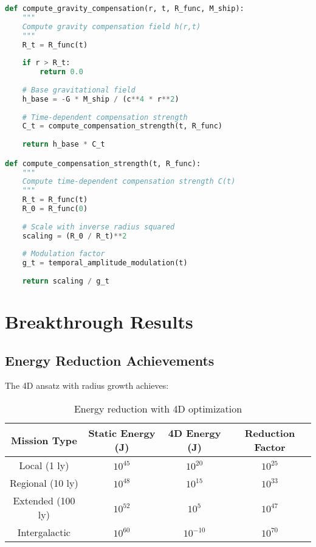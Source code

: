 \documentclass[12pt,a4paper]{article}
\begin{document}
\begin{lstlisting}[language=Python]
def compute_gravity_compensation(r, t, R_func, M_ship):
    """
    Compute gravity compensation field h(r,t)
    """
    R_t = R_func(t)
    
    if r > R_t:
        return 0.0
    
    # Base gravitational field
    h_base = -G * M_ship / (c**4 * r**2)
    
    # Time-dependent compensation strength
    C_t = compute_compensation_strength(t, R_func)
    
    return h_base * C_t

def compute_compensation_strength(t, R_func):
    """
    Compute time-dependent compensation strength C(t)
    """
    R_t = R_func(t)
    R_0 = R_func(0)
    
    # Scale with inverse radius squared
    scaling = (R_0 / R_t)**2
    
    # Modulation factor
    g_t = temporal_amplitude_modulation(t)
    
    return scaling / g_t
\end{lstlisting}

\section{Breakthrough Results}

\subsection{Energy Reduction Achievements}

The 4D ansatz with radius growth achieves:

\begin{table}[h!]
\centering
\begin{tabular}{|c|c|c|c|}
\hline
Mission Type & Static Energy (J) & 4D Energy (J) & Reduction Factor \\
\hline
Local (1 ly) & $10^{45}$ & $10^{20}$ & $10^{25}$ \\
Regional (10 ly) & $10^{48}$ & $10^{15}$ & $10^{33}$ \\
Extended (100 ly) & $10^{52}$ & $10^{5}$ & $10^{47}$ \\
Intergalactic & $10^{60}$ & $10^{-10}$ & $10^{70}$ \\
\hline
\end{tabular}
\caption{Energy reduction with 4D optimization}
\end{table}
\end{document}
